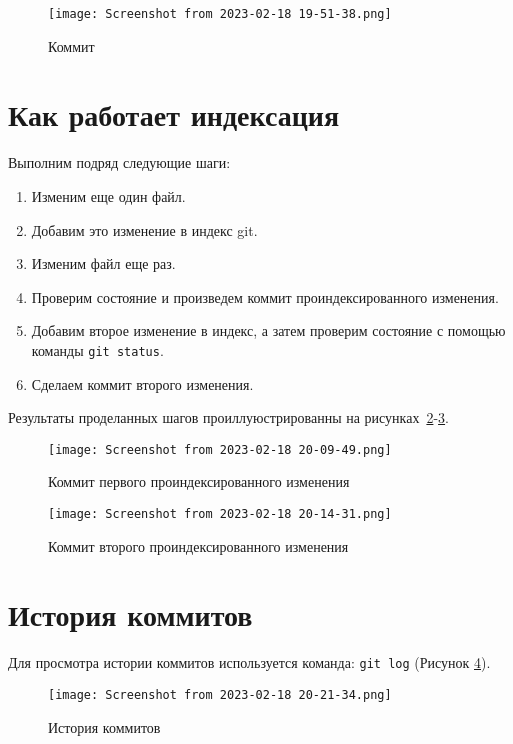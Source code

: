 \begin{figure}[h!tp]
	\centering
	\texttt{[image: Screenshot from 2023-02-18 19-51-38.png]}
	\caption{Коммит}
	\label{fig:git:second_commit}
\end{figure}

\section{Как работает индексация}
Выполним подряд следующие шаги:
\begin{enumerate}
	\item Изменим еще один файл.
	\item Добавим это изменение в индекс git.
	\item Изменим файл еще раз.
	\item Проверим состояние и произведем коммит проиндексированного
	изменения.
	\item Добавим второе изменение в индекс,
	а затем проверим состояние с помощью команды \texttt{git~status}.
	\item Сделаем коммит второго изменения.
\end{enumerate}

Результаты проделанных шагов проиллуюстрированны на
рисунках~\ref{fig:git:first_indexed_change}-\ref{fig:git:second_indexed_change}.

\begin{figure}[h!tp]
	\centering
	\texttt{[image: Screenshot from 2023-02-18 20-09-49.png]}
	\caption{Коммит первого проиндексированного изменения}
	\label{fig:git:first_indexed_change}
\end{figure}

\begin{figure}[h!tp]
	\centering
	\texttt{[image: Screenshot from 2023-02-18 20-14-31.png]}
	\caption{Коммит второго проиндексированного изменения}
	\label{fig:git:second_indexed_change}
\end{figure}

\section{История коммитов}
Для просмотра истории коммитов используется команда: \texttt{git~log}
(Рисунок \ref{fig:git:log}).

\begin{figure}[h!tp]
	\centering
	\texttt{[image: Screenshot from 2023-02-18 20-21-34.png]}
	\caption{История коммитов}
	\label{fig:git:log}
\end{figure}


